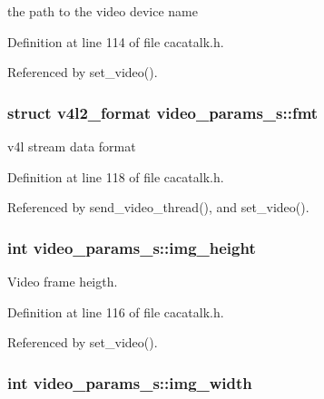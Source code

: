 the path to the video device name 



\-Definition at line 114 of file cacatalk.\-h.



\-Referenced by set\-\_\-video().

\hypertarget{structvideo__params__s_a10f56a8af702f24871d7dff8745380fe}{
\subsubsection[{fmt}]{\setlength{\rightskip}{0pt plus 5cm}struct v4l2\-\_\-format {\bf video\-\_\-params\-\_\-s\-::fmt}}}\label{structvideo__params__s_a10f56a8af702f24871d7dff8745380fe}


v4l stream data format 



\-Definition at line 118 of file cacatalk.\-h.



\-Referenced by send\-\_\-video\-\_\-thread(), and set\-\_\-video().

\hypertarget{structvideo__params__s_aff04696ffc57cb0ae2676fe9e3ffe354}{
\subsubsection[{img\-\_\-height}]{\setlength{\rightskip}{0pt plus 5cm}int {\bf video\-\_\-params\-\_\-s\-::img\-\_\-height}}}\label{structvideo__params__s_aff04696ffc57cb0ae2676fe9e3ffe354}


\-Video frame heigth. 



\-Definition at line 116 of file cacatalk.\-h.



\-Referenced by set\-\_\-video().

\hypertarget{structvideo__params__s_a8da7922c30e29e54fa97380d1c957a18}{
\subsubsection[{img\-\_\-width}]{\setlength{\rightskip}{0pt plus 5cm}int {\bf video\-\_\-params\-\_\-s\-::img\-\_\-width}}}\label{structvideo__params__s_a8da7922c30e29e54fa97380d1c957a18}



